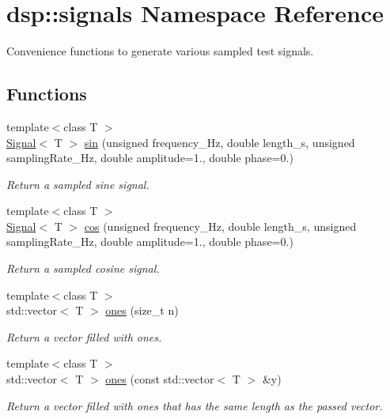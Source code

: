 \hypertarget{namespacedsp_1_1signals}{}\section{dsp\+:\+:signals Namespace Reference}
\label{namespacedsp_1_1signals}


Convenience functions to generate various sampled test signals.  


\subsection*{Functions}
\begin{DoxyCompactItemize}
\item 
{\footnotesize template$<$class T $>$ }\\\mbox{\hyperlink{classdsp_1_1_signal}{Signal}}$<$ T $>$ \mbox{\hyperlink{namespacedsp_1_1signals_a932acf8ed8375e1a15abba69badf0ee0}{sin}} (unsigned frequency\+\_\+\+Hz, double length\+\_\+s, unsigned sampling\+Rate\+\_\+\+Hz, double amplitude=1., double phase=0.)
\begin{DoxyCompactList}\small\item\em Return a sampled sine signal. \end{DoxyCompactList}\item 
{\footnotesize template$<$class T $>$ }\\\mbox{\hyperlink{classdsp_1_1_signal}{Signal}}$<$ T $>$ \mbox{\hyperlink{namespacedsp_1_1signals_ad1db657bf187b930ec8c53f20e20b759}{cos}} (unsigned frequency\+\_\+\+Hz, double length\+\_\+s, unsigned sampling\+Rate\+\_\+\+Hz, double amplitude=1., double phase=0.)
\begin{DoxyCompactList}\small\item\em Return a sampled cosine signal. \end{DoxyCompactList}\item 
{\footnotesize template$<$class T $>$ }\\std\+::vector$<$ T $>$ \mbox{\hyperlink{namespacedsp_1_1signals_a508782b7dda383cd01cd9db7dbfd1df3}{ones}} (size\+\_\+t n)
\begin{DoxyCompactList}\small\item\em Return a vector filled with ones. \end{DoxyCompactList}\item 
{\footnotesize template$<$class T $>$ }\\std\+::vector$<$ T $>$ \mbox{\hyperlink{namespacedsp_1_1signals_ae16d81991d7fe9195392aa7ca3d34297}{ones}} (const std\+::vector$<$ T $>$ \&y)
\begin{DoxyCompactList}\small\item\em Return a vector filled with ones that has the same length as the passed vector. \end{DoxyCompactList}\end{DoxyCompactItemize}


